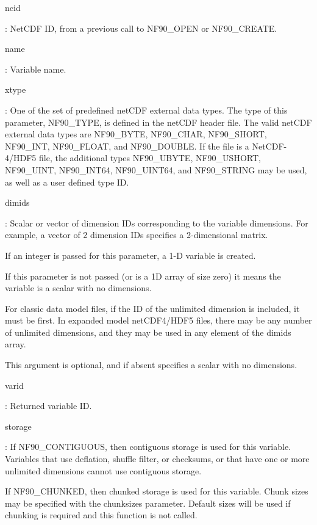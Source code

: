 {\ttfamily ncid}

\+: Net\+C\+DF ID, from a previous call to N\+F90\+\_\+\+O\+P\+EN or N\+F90\+\_\+\+C\+R\+E\+A\+TE.

{\ttfamily name}

\+: Variable name.

{\ttfamily xtype}

\+: One of the set of predefined net\+C\+DF external data types. The type of this parameter, N\+F90\+\_\+\+T\+Y\+PE, is defined in the net\+C\+DF header file. The valid net\+C\+DF external data types are N\+F90\+\_\+\+B\+Y\+TE, N\+F90\+\_\+\+C\+H\+AR, N\+F90\+\_\+\+S\+H\+O\+RT, N\+F90\+\_\+\+I\+NT, N\+F90\+\_\+\+F\+L\+O\+AT, and N\+F90\+\_\+\+D\+O\+U\+B\+LE. If the file is a Net\+C\+D\+F-\/4/\+H\+D\+F5 file, the additional types N\+F90\+\_\+\+U\+B\+Y\+TE, N\+F90\+\_\+\+U\+S\+H\+O\+RT, N\+F90\+\_\+\+U\+I\+NT, N\+F90\+\_\+\+I\+N\+T64, N\+F90\+\_\+\+U\+I\+N\+T64, and N\+F90\+\_\+\+S\+T\+R\+I\+NG may be used, as well as a user defined type ID.

{\ttfamily dimids}

\+: Scalar or vector of dimension I\+Ds corresponding to the variable dimensions. For example, a vector of 2 dimension I\+Ds specifies a 2-\/dimensional matrix.

If an integer is passed for this parameter, a 1-\/D variable is created.

If this parameter is not passed (or is a 1D array of size zero) it means the variable is a scalar with no dimensions.

For classic data model files, if the ID of the unlimited dimension is included, it must be first. In expanded model net\+C\+D\+F4/\+H\+D\+F5 files, there may be any number of unlimited dimensions, and they may be used in any element of the dimids array.

This argument is optional, and if absent specifies a scalar with no dimensions.

{\ttfamily varid}

\+: Returned variable ID.

{\ttfamily storage}

\+: If N\+F90\+\_\+\+C\+O\+N\+T\+I\+G\+U\+O\+US, then contiguous storage is used for this variable. Variables that use deflation, shuffle filter, or checksums, or that have one or more unlimited dimensions cannot use contiguous storage.

If N\+F90\+\_\+\+C\+H\+U\+N\+K\+ED, then chunked storage is used for this variable. Chunk sizes may be specified with the chunksizes parameter. Default sizes will be used if chunking is required and this function is not called.

